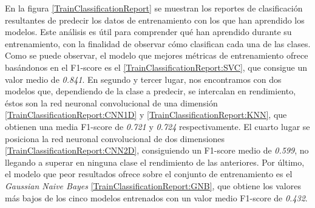     En la figura \eqref{TrainClassificationReport} se muestran los reportes de clasificación resultantes de predecir los datos de entrenamiento con los que han aprendido los modelos. Este análisis es útil para comprender qué han aprendido durante su entrenamiento, con la finalidad de observar cómo clasifican cada una de las clases. Como se puede observar, el modelo que mejores métricas de entrenamiento ofrece basándonos en el F1-score es el  \eqref{TrainClassificationReport:SVC}, que consigue un valor medio de \textit{0.841}. En segundo y tercer lugar, nos encontramos con dos modelos que, dependiendo de la clase a predecir, se intercalan en rendimiento, éstos son la red neuronal convolucional de una dimensión \eqref{TrainClassificationReport:CNN1D} y  \eqref{TrainClassificationReport:KNN}, que obtienen una media F1-score de \textit {0.721} y \textit {0.724} respectivamente. El cuarto lugar se posiciona la red neuronal convolucional de dos dimensiones \eqref{TrainClassificationReport:CNN2D}, consiguiendo un F1-score medio de \textit{0.599}, no llegando a superar en ninguna clase el rendimiento de las anteriores. Por último, el modelo que peor resultados ofrece sobre el conjunto de entrenamiento es el \textit{Gaussian Naive Bayes} \eqref{TrainClassificationReport:GNB}, que obtiene los valores más bajos de los cinco modelos entrenados con un valor medio F1-score de \textit{0.432}.

